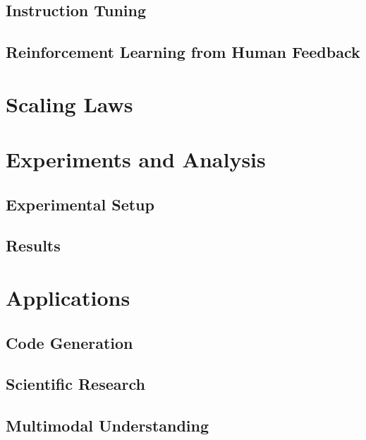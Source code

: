 \documentclass[conference]{IEEEtran}
\begin{document}
\subsection{Instruction Tuning}

\subsection{Reinforcement Learning from Human Feedback}

\section{Scaling Laws}
\label{sec:scaling}

\section{Experiments and Analysis}
\label{sec:experiments}

\subsection{Experimental Setup}

\subsection{Results}

\section{Applications}
\label{sec:applications}

\subsection{Code Generation}

\subsection{Scientific Research}

\subsection{Multimodal Understanding}
\end{document}
